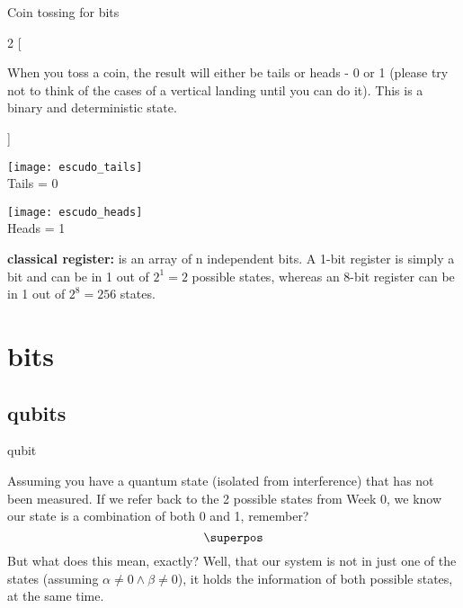 \documentclass[aspectratio=43]{beamer}
\begin{document}
\begin{frame}{Coin tossing for bits}
	\begin{multicols}{2}
		[
		\begin{cardTiny}
			When you toss a coin, the result will either be tails or heads - 0 or 1 (please try not to think of the cases of a vertical landing until you can do it). This is a binary and deterministic state.
		\end{cardTiny}
		]
        \begin{center}
	        \texttt{[image: escudo\_tails]}
	        \\Tails = 0
    	\end{center}
        \begin{center}
	        \texttt{[image: escudo\_heads]}
	        \\Heads = 1
    	\end{center}
	\end{multicols}
	\begin{cardTiny}
		\textbf{classical register:} is an array of n independent bits. A 1-bit register is simply a bit and can be in 1 out of $2^1 = 2$ possible states, whereas an 8-bit register can be in 1 out of $2^8 = 256$ states.
	\end{cardTiny}
\pagenumber
\end{frame}

\section{\q bits}
\subsection{qubits}
\begin{frame}{qubit}
    \begin{card}
    Assuming you have a quantum state (isolated from interference) that has not been measured. If we refer back to the 2 possible states from Week 0, we know our state is a combination of both 0 and 1, remember? \begin{equation*}
        \superpos
    \end{equation*}
    But what does this mean, exactly? Well, that our system is not in just one of the states (assuming $\alpha \neq 0 \wedge \beta \neq 0$), it holds the information of both possible states, at the same time.
    \end{card}
\pagenumber
\end{frame}
\end{document}
